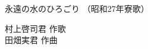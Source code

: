 \documentclass[10pt,b5j]{tarticle} %
\begin{document}
\begin{minipage}[c]{0.7\hsize} %
    \begin{center}
        {\LARGE
            永遠の水のひろごり %
        }
        {\small 
            （昭和27年寮歌） %
        }
    \end{center}
\end{minipage}
\begin{minipage}[c]{0.3\hsize} %
    \begin{flushright} %
        村上啓司君 作歌\\田畑実君 作曲 %
    \end{flushright}
\end{minipage}
\end{document}
